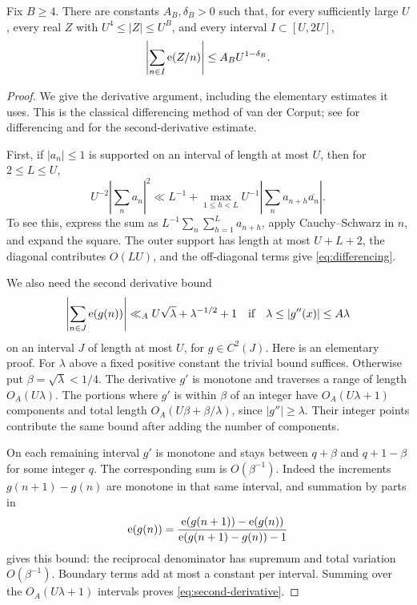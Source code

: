 \begin{lemma}\label{lem:reciprocal-phase}
Fix \(B\ge4\).  There are constants \(A_B,\delta_B>0\) such that,
for every sufficiently large \(U\), every real \(Z\) with
\(U^4\le |Z|\le U^B\), and every interval \(I\subset[U,2U]\),
\[
 \left|\sum_{n\in I}\mathrm e(Z/n)\right|\le A_BU^{1-\delta_B}.
\]
\end{lemma}
\begin{proof}
We give the derivative argument, including the elementary estimates
it uses.  This is the classical differencing method of van der Corput;
see \cite[Lemma~2.5]{GrahamKolesnik1991} for differencing and
\cite[Theorem~2.2]{GrahamKolesnik1991} for the second-derivative estimate.

First, if \(|a_n|\le1\) is supported on an interval of length at most
\(U\), then for \(2\le L\le U\),
\begin{equation}\label{eq:differencing}
 U^{-2}\left|\sum_n a_n\right|^2
 \ll L^{-1}
 +\max_{1\le h<L}U^{-1}
        \left|\sum_n a_{n+h}\overline{a_n}\right|.
\end{equation}
To see this, express the sum as
\(L^{-1}\sum_n\sum_{h=1}^L a_{n+h}\), apply Cauchy--Schwarz in \(n\),
and expand the square.  The outer support has length at most
\(U+L+2\), the diagonal contributes \(O(LU)\), and the off-diagonal
terms give \eqref{eq:differencing}.

We also need the second derivative bound
\begin{equation}\label{eq:second-derivative}
 \left|\sum_{n\in J}\mathrm e(g(n))\right|
 \ll_A U\sqrt\lambda+\lambda^{-1/2}+1
 \quad\text{if}\quad
 \lambda\le |g''(x)|\le A\lambda
\end{equation}
on an interval \(J\) of length at most \(U\), for \(g\in C^2(J)\).
Here is an elementary proof.  For \(\lambda\) above a fixed positive
constant the trivial bound suffices.  Otherwise put
\(\beta=\sqrt\lambda<1/4\).
The derivative \(g'\) is monotone and traverses a range of length
\(O_A(U\lambda)\).  The portions where \(g'\) is within \(\beta\)
of an integer have \(O_A(U\lambda+1)\) components and total length
\(O_A(U\beta+\beta/\lambda)\), since \(|g''|\ge\lambda\).
Their integer points contribute the same bound after adding the
number of components.

On each remaining interval \(g'\) is monotone and stays between
\(q+\beta\) and \(q+1-\beta\) for some integer \(q\).
The corresponding sum is \(O(\beta^{-1})\).  Indeed the increments
\(g(n+1)-g(n)\) are monotone in that same interval, and summation
by parts in
\[
 \mathrm e(g(n))=
 \frac{\mathrm e(g(n+1))-\mathrm e(g(n))}
      {\mathrm e(g(n+1)-g(n))-1}
\]
gives this bound: the reciprocal denominator has supremum and total
variation \(O(\beta^{-1})\).  Boundary terms add at most a constant
per interval.  Summing over the \(O_A(U\lambda+1)\) intervals proves
\eqref{eq:second-derivative}.


\end{proof}
